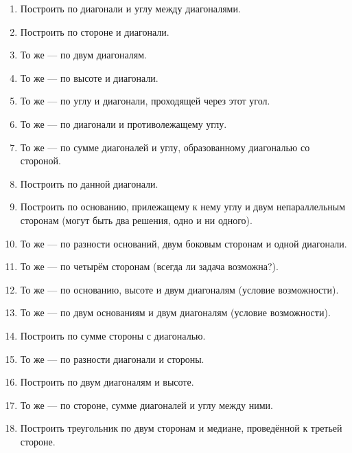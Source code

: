 \documentclass[twoside]{book}
\begin{document}
\begin{enumerate}[resume]
 \item
Построить  по диагонали и углу между диагоналями.

 \item
Построить  по стороне и диагонали.

 \item
То же — по двум диагоналям.

 \item
То же — по высоте и диагонали.

 \item
То же — по углу и диагонали, проходящей через этот угол.

 \item
То же — по диагонали и противолежащему углу.

 \item
То же — по сумме диагоналей и углу, образованному диагональю со стороной.

 \item
Построить  по данной диагонали.

 \item
Построить  по основанию, прилежащему к нему углу и двум непараллельным сторонам (могут быть два решения, одно и ни одного).

 \item
То же — по разности оснований, двум боковым сторонам и одной диагонали.

 \item
То же — по четырём сторонам (всегда ли задача возможна?).

 \item
То же — по основанию, высоте и двум диагоналям (условие возможности).

 \item
То же — по двум основаниям и двум диагоналям (условие возможности).

 \item
Построить  по сумме стороны с диагональю.

 \item
То же — по разности диагонали и стороны.

 \item
Построить  по двум диагоналям и высоте.

 \item
То же — по стороне, сумме диагоналей и углу между ними.

 \item
Построить треугольник по двум сторонам и медиане, проведённой к третьей стороне.


\end{enumerate}
\end{document}
